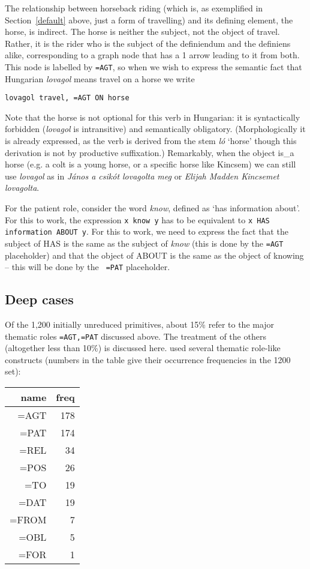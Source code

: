 \documentclass[11pt,bookmarks,bookmarksnumbered,naturalnames,plainpages=false,pdftex,colorlinks=true,urlcolor=blue,bookmarksdepth=subsection,plainpages=false]{paper}
\begin{document}
The relationship between horseback riding (which is, as exemplified in
Section~\ref{default} above, just a form of travelling) and its defining
element, the horse, is indirect. The horse is neither the subject, not the
object of travel.  Rather, it is the rider who is the subject of the
definiendum and the definiens alike, corresponding to a graph node that has a
1 arrow leading to it from both. This node is labelled by {\tt =AGT}, so when
we wish to express the semantic fact that Hungarian {\it lovagol} means travel
on a horse we write

\begin{verbatim}
lovagol travel, =AGT ON horse
\end{verbatim} 

\noindent
Note that the horse is not optional for this verb in Hungarian: it is
syntactically forbidden ({\it lovagol} is intransitive) and semantically
obligatory. (Morphologically it is already expressed, as the verb is derived
from the stem {\it l\'o} `horse' though this derivation is not by productive
suffixation.) Remarkably, when the object is\_a horse (e.g. a colt is a young
horse, or a specific horse like Kincsem) we can still use {\it lovagol} as in
{\it J\'anos a csik\'ot lovagolta meg} or {\it Elijah Madden Kincsemet
  lovagolta}.

For the patient role, consider the word {\it know}, defined as `has
information about'. For this to work, the expression {\tt x know y} has to be
equivalent to {\tt x HAS information ABOUT y}. For this to work, we need to
express the fact that the subject of HAS is the same as the subject of {\it
  know} (this is done by the {\tt =AGT} placeholder) and that the object of
ABOUT is the same as the object of knowing -- this will be done by the {\tt
  =PAT} placeholder. 

\subsection{Deep cases}\label{deepcase}

Of the 1,200 initially unreduced primitives, about 15\% refer to the major
thematic roles {\tt =AGT,=PAT} discussed above. The treatment of the others
(altogether less than 10\%) is discussed here. \cite{Makrai:2014} used several 
thematic role-like constructs (numbers in the table give their occurrence
frequencies in the 1200 set):

\begin{tabular}{rr}
name & freq\\
\hline
=AGT & 178\\
=PAT & 174\\
=REL & 34\\
=POS & 26\\
=TO & 19\\
=DAT & 19\\
=FROM & 7\\
=OBL & 5\\
=FOR & 1\\
\end{tabular}
\end{document}
